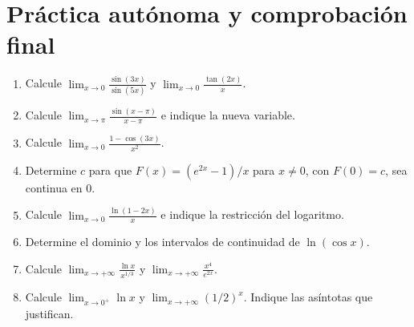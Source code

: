 \documentclass[10pt,a5paper]{article}
\newif\ifmostrarSoluciones
\begin{document}
\section*{Práctica autónoma y comprobación final}
\begin{ejercicios}
\begin{enumerate}
  \item Calcule $\displaystyle\lim_{x\to0}\frac{\sin(3x)}{\sin(5x)}$ y $\displaystyle\lim_{x\to0}\frac{\tan(2x)}x$.
  \item Calcule $\displaystyle\lim_{x\to\pi}\frac{\sin(x-\pi)}{x-\pi}$ e indique la nueva variable.
  \item Calcule $\displaystyle\lim_{x\to0}\frac{1-\cos(3x)}{x^2}$.
  \item Determine $c$ para que $F(x)=(e^{2x}-1)/x$ para $x\neq0$, con $F(0)=c$, sea continua en $0$.
  \item Calcule $\displaystyle\lim_{x\to0}\frac{\ln(1-2x)}x$ e indique la restricción del logaritmo.
  \item Determine el dominio y los intervalos de continuidad de $\ln(\cos x)$.
  \item Calcule $\displaystyle\lim_{x\to+\infty}\frac{\ln x}{x^{1/3}}$ y $\displaystyle\lim_{x\to+\infty}\frac{x^4}{e^{2x}}$.
  \item Calcule $\displaystyle\lim_{x\to0^+}\ln x$ y $\displaystyle\lim_{x\to+\infty}(1/2)^x$. Indique las asíntotas que justifican.
\end{enumerate}
\end{ejercicios}
\ifmostrarSoluciones
\begin{solucion}[de la práctica]
\begin{enumerate}
  \item $3/5$ y $2$, ajustando cada cociente a su argumento.
  \item Con $t=x-\pi\to0$, el límite es $1$.
  \item Es $9/2$, pues se escribe $9(1-\cos(3x))/(3x)^2$.
  \item $c=2$, ya que $(e^{2x}-1)/x=2(e^{2x}-1)/(2x)\to2$.
  \item Se exige $1-2x>0$, es decir, $x<1/2$. Con $t=-2x$, el cociente es $-2\ln(1+t)/t$, por lo que el límite es $-2$.
  \item El dominio es la unión, para $k\in\mathbb{Z}$, de los intervalos $(-\pi/2+2k\pi,\pi/2+2k\pi)$. En cada uno, el coseno es positivo y la composición con el logaritmo es continua.
  \item Ambos límites son $0$ por comparación de crecimientos.
  \item Los límites son $-\infty$ y $0$, respectivamente. Para $\ln x$, $x=0$ es una asíntota vertical; para $(1/2)^x$, $y=0$ es una asíntota horizontal hacia $+\infty$.
\end{enumerate}
\end{solucion}
\fi
\end{document}
